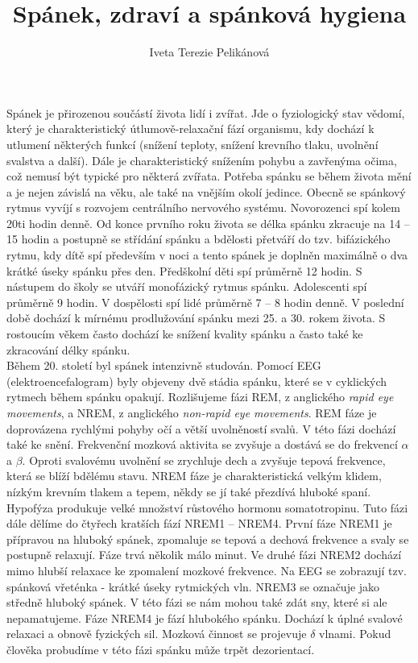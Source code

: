 \documentclass[a4paper]{scrartcl}
\title{Spánek, zdraví a spánková hygiena}
\subtitle{}
\author{Iveta Terezie Pelikánová}
\date{}
\begin{document}
\maketitle 

Spánek je přirozenou součástí života lidí i zvířat. 
Jde o fyziologický stav vědomí, který je charakteristický útlumově-relaxační
fází organismu, kdy dochází k utlumení některých funkcí (snížení teploty,
snížení krevního tlaku, uvolnění svalstva a další). Dále je charakteristický snížením
pohybu a zavřenýma očima, což nemusí být typické pro některá zvířata. 
Potřeba spánku se během života mění a je nejen závislá na věku, ale také na vnějším
okolí jedince. Obecně se spánkový rytmus vyvíjí s rozvojem centrálního nervového
systému. Novorozenci spí kolem 20ti hodin denně. Od konce prvního roku života se délka
spánku zkracuje na 14 -- 15 hodin a postupně se střídání spánku a bdělosti přetváří do
tzv. bifázického rytmu, kdy dítě spí především v noci a tento spánek je doplněn
maximálně o dva krátké úseky spánku přes den. Předškolní děti spí průměrně 12 hodin. 
S nástupem do školy se utváří monofázický rytmus spánku. Adolescenti spí průměrně 9 
hodin. V dospělosti spí lidé průměrně 7 -- 8 hodin denně. V poslední době dochází 
k mírnému prodlužování spánku mezi 25. a 30. rokem života. S rostoucím věkem často 
dochází ke snížení kvality spánku a často také ke zkracování délky spánku.\cite{Truhlarova_biochemie_spanku,Barosova_fyziologie_spanku}\\

Během 20. století byl spánek intenzivně studován. Pomocí EEG (elektroencefalogram)
byly objeveny dvě stádia spánku, které se v cyklických rytmech během spánku opakují.
Rozlišujeme fázi REM, z anglického \emph{rapid eye movements}, a NREM, z anglického \emph{non-rapid eye movements}.
REM fáze je doprovázena rychlými pohyby očí a větší uvolněností svalů. V této fázi
dochází také ke snění. Frekvenční mozková aktivita se zvyšuje a dostává se do frekvencí $\alpha$ a $\beta$. Oproti svalovému uvolnění se zrychluje dech a zvyšuje tepová frekvence, která se blíží bdělému stavu. \cite{Barosova_fyziologie_spanku,Vitu_ukladani_ke_spanku,brain_basics_ninds}
NREM fáze je charakteristická velkým klidem, nízkým krevním tlakem a 
tepem, někdy se jí také přezdívá hluboké spaní. Hypofýza produkuje velké množství růstového hormonu 
somatotropinu. Tuto fázi dále dělíme do čtyřech kratších fází NREM1 --
NREM4. První fáze NREM1 je přípravou na hluboký spánek, zpomaluje se 
tepová a dechová frekvence a svaly se postupně relaxují. Fáze trvá 
několik málo minut. Ve druhé fázi NREM2 dochází mimo hlubší relaxace 
ke zpomalení mozkové frekvence. Na EEG se zobrazují tzv. spánková 
vřeténka - krátké úseky rytmických vln. NREM3 se označuje jako středně 
hluboký spánek. V této fázi se nám mohou také zdát sny, které si ale 
nepamatujeme. Fáze NREM4 je fází hlubokého spánku. Dochází k úplné 
svalové relaxaci a obnově fyzických sil. Mozková činnost se projevuje
$\delta$ vlnami. Pokud člověka probudíme v této fázi spánku může
trpět dezorientací. 
\cite{Truhlarova_biochemie_spanku,Vitu_ukladani_ke_spanku,brain_basics_ninds,wikipedie_sleep}
\end{document}

